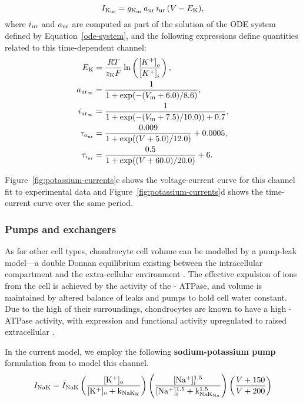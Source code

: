 \begin{equation}
    I_{\rm K_{\rm ur}} = g_{\rm K_{\rm ur}}\, a_{\rm ur}\, i_{\rm
      ur}\, (V - E_{\rm K}),
\end{equation}
where $i_{\rm ur}$ and $a_{\rm ur}$ are computed as part of the
solution of the ODE system defined by Equation~\ref{ode-system}, and
the following expressions define quantities related to this
time-dependent channel:
\begin{equation*}
  \begin{split}
    E_{\rm K} & =  \frac{R T}{z_{\rm K} F}
    \ln\left(\frac{\left[K^{+}\right]_{o}}
      {\left[K^{+}\right]_{i}}\right),\\
    a_{{\rm ur}_{\infty}} & = \frac{1}{1 + \exp(-(V_{\rm m} +
      6.0)/8.6)},\\
    i_{{\rm ur}_{\infty}} & = \frac{1}{1 + \exp(-(V_{\rm m} +
      7.5)/10.0)) + 0.7},\\
    \tau_{a_{\rm ur}} & = \frac{0.009}{1 + \exp((V + 5.0)/12.0)} +
    0.0005,\\
    \tau_{i_{\rm ur}} & = \frac{0.5}{1 + \exp((V +60.0)/20.0)} +
    6.\\
  \end{split}
\end{equation*}

Figure~\ref{fig:potassium-currents}c shows the voltage-current
curve for this channel fit to experimental data
\citep{Clarketal2011} and Figure~\ref{fig:potassium-currents}d shows
the time-current curve over the same period.

\subsubsection*{Pumps and exchangers}
\label{sec:pumps-and-exchangers}

As for other cell types, chondrocyte cell volume can be modelled by a
pump-leak model---a double Donnan equilibrium existing between the
intracellular compartment and the extra-cellular environment
\citep{Stockwell1991}. The effective expulsion of \Na{} ions from the
cell is achieved by the activity of the \Na-\K{} ATPase, and volume is
maintained by altered balance of leaks and pumps to hold cell water
constant. Due to the high \Nao{} of their surroundings, chondrocytes are
known to have a high \Na-\K{} ATPase activity, with expression and
functional activity upregulated to raised extracellular \Na{}
\citep{Mobasherietal1997}.

In the current model, we employ the following {\bf sodium-potassium
  pump} formulation from \citet{Nygrenetal1998} to model this channel.
\begin{equation}
  I_{\rm NaK} =
  \bar{I}_{\rm NaK} \left( \frac{[\rm K^{+}]_{\rm o}}{[\rm K^{+}]_{\rm o} +
    k_{\rm NaK_{K}}} \right) \left(\frac{[\rm Na^{+}]^{1.5}_{\rm i}}{[\rm
    Na^{+}]^{1.5}_{\rm i} + k^{1.5}_{\rm NaK_{Na}}}\right) \left( \frac{V + 150}{V +
    200} \right)
\end{equation}

